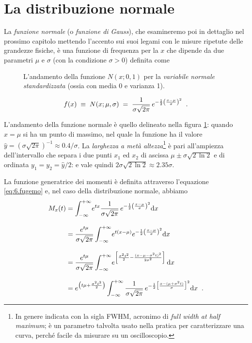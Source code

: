 \section{La distribuzione normale}%
%
\label{ch:8.gauss}
La \emph{funzione normale} (o \emph{funzione di Gauss}), che
esamineremo poi in dettaglio nel prossimo capitolo mettendo
l'accento sui suoi legami con le misure ripetute delle
grandezze fisiche, \`e una funzione di frequenza per la $x$
che dipende da due parametri $\mu$ e $\sigma$ (con la
condizione $\sigma > 0$) definita come
\begin{figure}[htbp]
  \vspace*{2ex}
  \begin{center} {
    
  } \end{center}
  \caption[La distribuzione normale standardizzata]
    {L'andamento della funzione $N(x;0,1)$ per la
    \emph{variabile normale standardizzata} (ossia con media
    0 e varianza 1).}
  \label{fig:8.gauss}
\end{figure}
\begin{equation*}
  f(x) \; \equiv \; N(x; \mu, \sigma) \; = \;
    \frac{1}{\sigma \sqrt{2 \pi}} \, e^{ - \frac{1}{2}
    \left( \frac{x - \mu}{\sigma} \right)^2} \;\; .
\end{equation*}

L'andamento della funzione normale \`e quello delineato
nella figura \ref{fig:8.gauss}: quando $x = \mu$ si ha un
punto di massimo, nel quale la funzione ha il valore
$\widehat y = ( \sigma \sqrt{2 \pi} )^{-1} \approx 0.4 /
\sigma$.  La \emph{larghezza a met\`a
  altezza}\thinspace\footnote{In genere indicata con la
  sigla FWHM, acronimo di \emph{full width at half maximum};
  \`e un parametro talvolta usato nella pratica per
  caratterizzare una curva, perch\'e facile da misurare su
  un oscilloscopio.}  \`e pari all'ampiezza dell'intervallo
che separa i due punti $x_1$ ed $x_2$ di ascissa $\mu \pm
\sigma \sqrt{2 \, \ln 2}$ e di ordinata $y_1 = y_2 =
\widehat y / 2$: e vale quindi $2 \sigma \sqrt{2 \, \ln 2}
\approx 2.35 \sigma$.

La funzione generatrice dei momenti \`e definita attraverso
l'equazione \eqref{eq:6.fugemo} e, nel caso della
distribuzione normale, abbiamo
\begin{align*}
  M_x(t) &= \int_{-\infty}^{+\infty} \! e^{
    tx} \frac{1}{\sigma \sqrt{2 \pi}} \,
    e^{ - \frac{1}{2} \left( \frac{x -
    \mu}{\sigma} \right)^2} \mathrm{d} x \\[2ex]
  &= \frac{e^{ t \mu}}{\sigma \sqrt{2
    \pi}} \int_{-\infty}^{+\infty} \! e^{
    t (x - \mu)} e^{ - \frac{1}{2} \left(
    \frac{x - \mu}{\sigma} \right)^2} \mathrm{d} x \\[2ex]
  &= \frac{e^{ t \mu}}{\sigma \sqrt{2
    \pi}} \int_{-\infty}^{+\infty} \! e^{
    \left[ \frac{\sigma^2 t^2}{2} - \frac{(x - \mu -
    \sigma^2 t)^2}{2 \sigma^2} \right]} \, \mathrm{d} x
    \\[2ex]
  &= e^{ \left( t \mu + \frac{\sigma^2
    t^2}{2} \right)} \int_{-\infty}^{+\infty}
    \frac{1}{\sigma \sqrt{2 \pi}} \, e^{ -
    \frac{1}{2} \bigl[ \frac{x - ( \mu + \sigma^2 t
    )}{\sigma} \bigr] ^2} \mathrm{d} x \;\; .
\end{align*}

